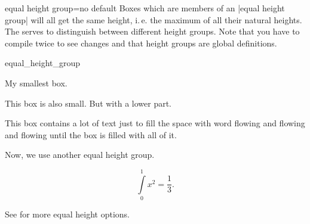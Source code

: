 \clearpage
\begin{docTcbKey}[][doc updated=2014-11-07]{equal height group}{=}{no default}
  Boxes which are members of an |equal height group| will all get the
  same height, i.\,e. the maximum of all their natural heights. The
   serves to distinguish between different height groups.
  Note that you have to compile twice to see changes and
  that height groups are global definitions.


\begin{exdispExample}[runs=2]{equal_height_group}

\begin{tcolorbox}[equal height group=A,adjusted title={One}]
  My smallest box.
\end{tcolorbox}%
\begin{tcolorbox}[equal height group=A,adjusted title={Two}]
  This box is also small.
  \tcblower
  But with a lower part.
\end{tcolorbox}%
\begin{tcolorbox}[equal height group=A,adjusted title={Three}]
  This box contains a lot of text just to fill the space
  with word flowing and flowing and flowing until the box
  is filled with all of it.
\end{tcolorbox}\linebreak
%
%
\begin{tcolorbox}[equal height group=B]
  Now, we use another equal height group.
\end{tcolorbox}%
\begin{tcolorbox}[equal height group=B,after=]
  \begin{equation*}
    \int\limits_{0}^{1} x^2 = \frac13.
  \end{equation*}
\end{tcolorbox}
\end{exdispExample}
\end{docTcbKey}

\medskip
\begin{marker}
See  for more equal height options.
\end{marker}

